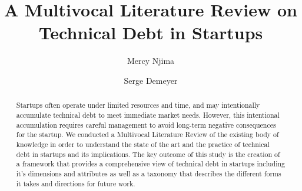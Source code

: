 \documentclass[manuscript]{acmart}
\begin{document}
%
\title{A Multivocal Literature Review on Technical Debt in Startups}
%
\author{Mercy Njima}

\author{Serge Demeyer}

%

%
\begin{abstract}
 Startups often operate under limited resources and time, and may intentionally accumulate technical debt to meet immediate market needs.
 However, this intentional accumulation requires careful management to avoid long-term negative consequences for the startup.
 We conducted a Multivocal Literature Review of the existing body of knowledge in order to understand the state of the art and the practice
 of technical debt in startups and its implications. The key outcome of this study is the creation of a framework that provides a
 comprehensive view of technical debt in startups including it's dimensions and attributes as well as a taxonomy that describes the
 different forms it takes and directions for future work.
\end{abstract}
%
%
\end{document}
